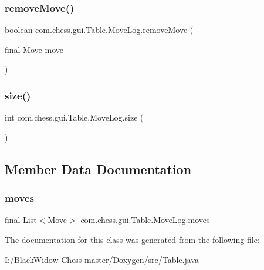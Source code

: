 \subsubsection{\texorpdfstring{removeMove()}{removeMove()}\hspace{0.1cm}{\footnotesize\ttfamily [2/2]}}
{\footnotesize\ttfamily boolean com.\+chess.\+gui.\+Table.\+Move\+Log.\+remove\+Move (\begin{DoxyParamCaption}\item[{final Move}]{move }\end{DoxyParamCaption})\hspace{0.3cm}{\ttfamily [package]}}

\mbox{\label{classcom_1_1chess_1_1gui_1_1_table_1_1_move_log_a36889c8f4c9769b54153e10e8cabc85b}} 
\subsubsection{\texorpdfstring{size()}{size()}}
{\footnotesize\ttfamily int com.\+chess.\+gui.\+Table.\+Move\+Log.\+size (\begin{DoxyParamCaption}{ }\end{DoxyParamCaption})}



\subsection{Member Data Documentation}
\mbox{\label{classcom_1_1chess_1_1gui_1_1_table_1_1_move_log_aed3be7fd7d7c1719dbe66c876eeb7204}} 
\subsubsection{\texorpdfstring{moves}{moves}}
{\footnotesize\ttfamily final List$<$Move$>$ com.\+chess.\+gui.\+Table.\+Move\+Log.\+moves\hspace{0.3cm}{\ttfamily [private]}}



The documentation for this class was generated from the following file\+:\begin{DoxyCompactItemize}
\item 
I\+:/\+Black\+Widow-\/\+Chess-\/master/\+Doxygen/src/\mbox{\hyperlink{_table_8java}{Table.\+java}}\end{DoxyCompactItemize}
